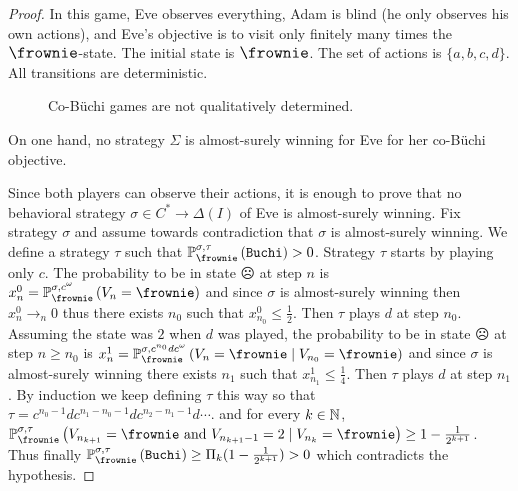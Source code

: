 \begin{proof}
In this game, Eve observes
everything, Adam is blind (he only observes his own actions),
and Eve's objective is to visit only finitely many times the ${\large \frownie}$-state. The initial state is $\large{\frownie}$. The set of actions is $\{a,b,c,d\}$.
All transitions are deterministic.%

\begin{figure}[h]
\begin{center}
\end{center}
\caption{Co-B\"uchi games are not qualitatively determined.}
\label{chap9fig4}
\end{figure} 


On one hand, no strategy $\Sigma$
is almost-surely winning for Eve
for her co-B\"uchi objective.
{
Since both players can observe their actions,
it is enough to prove that no behavioral
strategy
$\sigma\in C^*\to \Delta(I)$ of Eve is almost-surely winning.
Fix strategy $\sigma$ and assume towards contradiction that $\sigma$ is almost-surely winning. 
We define a strategy $\tau$
such that
$\probimp{\sigma,\tau}{\frownie}{ \winbuchi} > 0$.
Strategy $\tau$ starts by playing only $c$.
The probability to be in state $\frownie$ at step $n$ is
$x^{0}_n = \probimp{\sigma,c^\omega}{\frownie}{V_n=\frownie}$ and since $\sigma$ is almost-surely winning then $x^{0}_n \to_n 0$ thus there exists  $n_0$ such that 
$x^{0}_{n_0}\leq \frac{1}{2}$.
Then $\tau$ plays $d$ at step $n_0$.
Assuming the state was $2$ when $d$ was played, 
the probability to be in state $\frownie$ at step $n\geq n_0$ is
$x^{1}_n = \probimp{\sigma,c^{n_0}dc^\omega}{\frownie}{V_{n}=\frownie\mid V_{n_0}=\frownie}$
and since $\sigma$ is almost-surely winning there exists $n_1$ such that
$x^{1}_{n_1}\leq  \frac{1}{4}$.
Then $\tau$ plays $d$ at step $n_1$.
By induction we keep defining $\tau$ this way so that
$\tau=c^{n_0-1}d c^{n_1 - n_0 - 1}dc^{n_2 - n_1 - 1}d \cdots $.
and for every $k\in \mathbb{N}$,
$\probimp{\sigma,\tau}{\frownie}{
V_{n_{k+1}}=\frownie
\text{ and }
V_{n_{k+1}-1}=2
\mid 
V_{n_{k}}=\frownie
} \geq 1 - \frac{1}{2^{k+1}}$.
Thus finally
$\probimp{\sigma,\tau}{\frownie}{\winbuchi} \geq
\Pi_{k} (1 - \frac{1}{2^{k+1}})>0$ which contradicts the hypothesis.

}


\end{proof}

